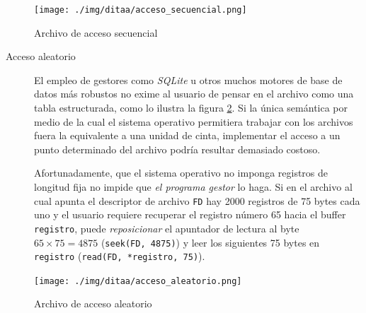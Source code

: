 \documentclass[11pt,fleqn]{book} %
\begin{document}
\begin{figure}[htb]
\centering
\texttt{[image: ./img/ditaa/acceso\_secuencial.png]}
\caption{\label{DIR_acceso_secuencial}Archivo de acceso secuencial}
\end{figure}

\begin{description}
\item[Acceso aleatorio] El empleo de gestores como \emph{SQLite} u otros
     muchos motores de base de datos más robustos no exime al usuario de
     pensar en el archivo como una tabla estructurada, como lo ilustra
     la figura \ref{DIR_acceso_aleatorio}. Si la única semántica por
     medio de la cual el sistema operativo permitiera trabajar con los
     archivos fuera la equivalente a una unidad de cinta, implementar
     el acceso a un punto determinado del archivo podría resultar
     demasiado costoso.

     Afortunadamente, que el sistema operativo no imponga registros
     de longitud fija no impide que \emph{el programa gestor} lo haga. Si
     en el archivo al cual apunta el descriptor de archivo \texttt{FD}
     hay 2000 registros de 75 bytes cada uno y el usuario requiere
     recuperar el registro número 65 hacia el buffer \texttt{registro}, puede
     \emph{reposicionar} el apuntador de lectura al byte $65 \times 75 =
     4875$ (\texttt{seek(FD, 4875)}) y leer los siguientes 75 bytes en
     \texttt{registro} (\texttt{read(FD, *registro, 75)}).
\end{description}

\begin{figure}[htb]
\centering
\texttt{[image: ./img/ditaa/acceso\_aleatorio.png]}
\caption{\label{DIR_acceso_aleatorio}Archivo de acceso aleatorio}
\end{figure}
\end{document}
